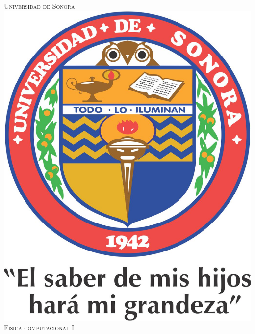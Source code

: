 \documentclass[12pt]{article}
\begin{document}
\begin{titlepage}

\newcommand{\HRule}{\rule{\linewidth}{0.5mm}} %

\center %
 

\textsc{\LARGE Universidad de Sonora} \\ [0.4cm]
\includegraphics[scale=.65]{./Images/Logo} \\ [0.3cm]
\textsc{\LARGE Física computacional I}\\[0.3cm]



\end{titlepage}
\end{document}
